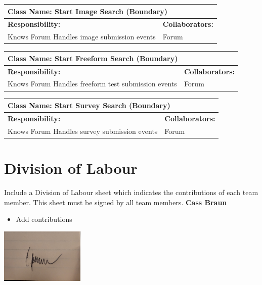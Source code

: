 \documentclass[]{article}
\begin{document}
\begin{itemize}
	\begin{table}[ht]
		\centering
		\begin{tabular}{|p{7cm}|p{7cm}|}
		\hline 
		 \multicolumn{2}{|l|}{\textbf{Class Name: Start Image Search (Boundary)}} \\
		\hline
		\textbf{Responsibility:} & \textbf{Collaborators:} \\
		\hline
		Knows Forum \newline
		Handles image submission events & Forum \\
		\hline
		\end{tabular}
	\end{table}
	
	\begin{table}[ht]
		\centering
		\begin{tabular}{|p{7cm}|p{7cm}|}
		\hline 
		 \multicolumn{2}{|l|}{\textbf{Class Name: Start Freeform Search (Boundary)}} \\
		\hline
		\textbf{Responsibility:} & \textbf{Collaborators:} \\
		\hline
		Knows Forum \newline
		Handles freeform test submission events & Forum \\
		\hline
		\end{tabular}
	\end{table}
	
	\begin{table}[ht]
		\centering
		\begin{tabular}{|p{7cm}|p{7cm}|}
		\hline 
		 \multicolumn{2}{|l|}{\textbf{Class Name: Start Survey Search (Boundary)}} \\
		\hline
		\textbf{Responsibility:} & \textbf{Collaborators:} \\
		\hline
		Knows Forum \newline
		Handles survey submission events & Forum \\
		\hline
		\end{tabular}
	\end{table}
	
	
	
\end{itemize}

\appendix
\section{Division of Labour}
\label{sec:division_of_labour}
Include a Division of Labour sheet which indicates the contributions of each team member. This sheet must be signed by all team members.
\newline
\newline
\textbf{Cass Braun}
\begin{itemize}
    \setlength\itemindent{2em}
\item Add contributions 
\end{itemize}
\includegraphics[width=0.3\textwidth]{Cass.jpg}
\end{document}
